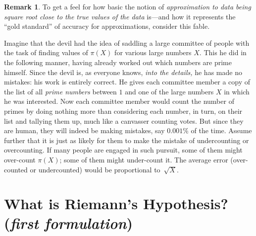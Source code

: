 \documentclass[openany]{book}
\theoremstyle{plain}
\theoremstyle{definition}
\newtheorem{remark}[theorem]{Remark}
\begin{document}
\begin{remark}
  To get a feel for how basic the notion of {\em approximation to data
    being square root close to the true values of the data} is---and
  how it represents the ``gold standard'' of accuracy for
  approximations, consider this fable.

  Imagine that the devil had the idea of saddling a large committee of
  people with the task of finding values of $\pi(X)$ for various large
  numbers $X$.  This he did in the following manner, having already
  worked out which numbers are prime himself. Since the devil is, as
  everyone knows, {\em into the details,} he has made no mistakes: his
  work is entirely correct.  He gives each committee member a copy of
  the list of all {\em prime numbers} between $1$ and one of the large
  numbers $X$ in which he was interested.  Now each committee member
  would count the number of primes by doing nothing more than
  considering each number, in turn, on their list and tallying them
  up, much like a canvasser counting votes. But since they are human,
  they will indeed be making mistakes, say $0.001\%$ of the time.
  Assume further that it is just as likely for them to make the
  mistake of undercounting or overcounting.  If many people are
  engaged in such pursuit, some of them might over-count $\pi(X)$;
  some of them might under-count it. The average error (over-counted
  or undercounted) would be proportional to~${\sqrt X}$.


\end{remark}

\chapter[What is Riemann's Hypothesis?] { What is Riemann's Hypothesis?  ({\em first formulation})\label{sec:rh1}}
\end{document}
